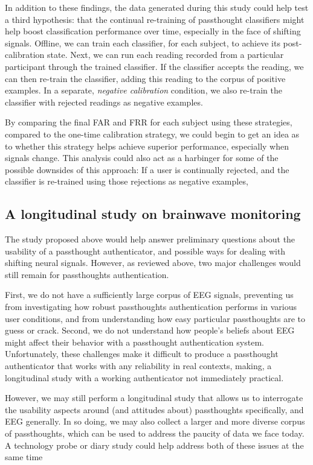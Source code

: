 \documentclass[sigconf]{acmart}
\begin{document}
In addition to these findings, the data generated during this study could help test 
a third hypothesis: that the continual re-training of passthought classifiers might help boost classification performance over time,
especially in the face of shifting signals.
Offline, we can train each classifier, for each subject, to achieve its post-calibration state.
Next, we can run each reading recorded from a particular participant through the trained classifier.
If the classifier accepts the reading, we can then re-train the classifier, 
adding this reading to the corpus of positive examples.
In a separate, \emph{negative calibration} condition, 
we also re-train the classifier with rejected readings as negative examples.

By comparing the final FAR and FRR for each subject using these strategies, 
compared to the one-time calibration strategy, we could begin to get an idea as to whether
this strategy helps achieve superior performance, especially when signals change.
This analysis could also act as a harbinger for some of the possible downsides of this approach:
If a user is continually rejected, and the classifier is re-trained using those rejections as negative examples,

\subsection{A longitudinal study on brainwave monitoring}
\label{sec:orgd647693}

The study proposed above would help answer preliminary questions about
the usability of a passthought authenticator,
and possible ways for dealing with shifting neural signals.
However, as reviewed above, two major challenges would still remain for passthoughts authentication.

First, we do not have a sufficiently large corpus of EEG signals, 
preventing us from investigating how robust passthoughts authentication performs in various user conditions,
and from understanding how easy particular passthoughts are to guess or crack.
Second, we do not understand how people's beliefs about EEG might affect their behavior with a passthought authentication system.
Unfortunately, these challenges make it difficult to produce a passthought authenticator that works with any reliability in real contexts,
making, a longitudinal study with a working authenticator not immediately practical.

However, we may still perform a longitudinal study that allows us to interrogate the usability aspects around (and attitudes about) passthoughts specifically, and EEG generally.
In so doing, we may also collect a larger and more diverse corpus of passthoughts, which can be used to address the paucity of data we face today.
A technology probe or diary study \cite{Gaver1999} could help address both of these issues at the same time 
\end{document}
